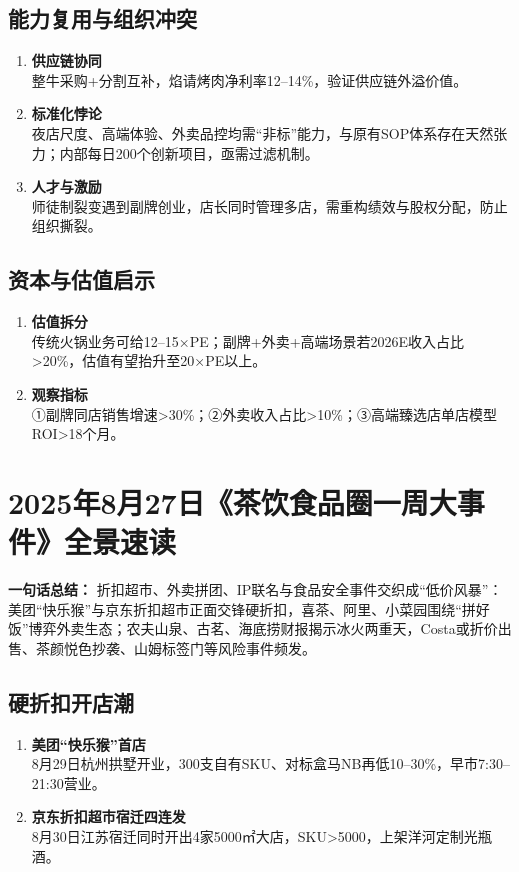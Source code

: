 \subsection{能力复用与组织冲突}
\begin{enumerate}[leftmargin=*, nosep]
    \item \textbf{供应链协同}  \\
    整牛采购+分割互补，焰请烤肉净利率12–14\%，验证供应链外溢价值。
    \item \textbf{标准化悖论}  \\
    夜店尺度、高端体验、外卖品控均需“非标”能力，与原有SOP体系存在天然张力；内部每日200个创新项目，亟需过滤机制。
    \item \textbf{人才与激励}  \\
    师徒制裂变遇到副牌创业，店长同时管理多店，需重构绩效与股权分配，防止组织撕裂。
\end{enumerate}

\subsection{资本与估值启示}
\begin{enumerate}[leftmargin=*, nosep]
    \item \textbf{估值拆分}  \\
    传统火锅业务可给12–15×PE；副牌+外卖+高端场景若2026E收入占比>20\%，估值有望抬升至20×PE以上。
    \item \textbf{观察指标}  \\
    ①副牌同店销售增速>30\%；②外卖收入占比>10\%；③高端臻选店单店模型ROI>18个月。
\end{enumerate}

\clearpage

\section{2025年8月27日《茶饮食品圈一周大事件》全景速读}
\textbf{一句话总结：}  
折扣超市、外卖拼团、IP联名与食品安全事件交织成“低价风暴”：美团“快乐猴”与京东折扣超市正面交锋硬折扣，喜茶、阿里、小菜园围绕“拼好饭”博弈外卖生态；农夫山泉、古茗、海底捞财报揭示冰火两重天，Costa或折价出售、茶颜悦色抄袭、山姆标签门等风险事件频发。

\subsection{硬折扣开店潮}
\begin{enumerate}[leftmargin=*, nosep]
    \item \textbf{美团“快乐猴”首店}  \\
    8月29日杭州拱墅开业，300支自有SKU、对标盒马NB再低10–30\%，早市7:30–21:30营业。
    \item \textbf{京东折扣超市宿迁四连发}  \\
    8月30日江苏宿迁同时开出4家5000㎡大店，SKU>5000，上架洋河定制光瓶酒。
\end{enumerate}


